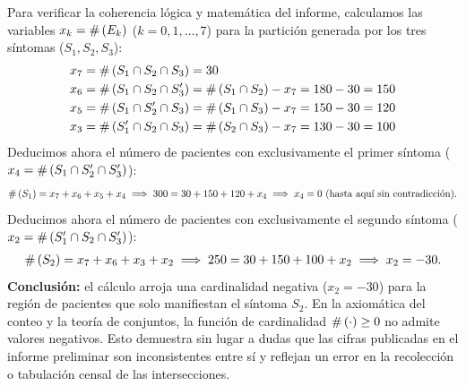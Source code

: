 \begin{solproblema}
	Para verificar la coherencia lógica y matemática del informe, calculamos las variables $x_k = \#\left( E_k \right)$ ($k=0,1,\dots,7$) para la partición generada por los tres síntomas ($S_1, S_2, S_3$):
	\begin{align}
		x_7 &= \#\left( S_1 \cap S_2 \cap S_3 \right) = 30 \\
		x_6 &= \#\left( S_1 \cap S_2 \cap S_3' \right) = \#\left( S_1 \cap S_2 \right) - x_7 = 180 - 30 = 150 \\
		x_5 &= \#\left( S_1 \cap S_2' \cap S_3 \right) = \#\left( S_1 \cap S_3 \right) - x_7 = 150 - 30 = 120 \\
		x_3 &= \#\left( S_1' \cap S_2 \cap S_3 \right) = \#\left( S_2 \cap S_3 \right) - x_7 = 130 - 30 = 100
	\end{align}
	Deducimos ahora el número de pacientes con exclusivamente el primer síntoma ($x_4 = \#\left( S_1 \cap S_2' \cap S_3' \right)$):
	\begin{align}
		\#\left( S_1 \right) = x_7 + x_6 + x_5 + x_4 \implies 300 = 30 + 150 + 120 + x_4 \implies x_4 = 0 \text{ (hasta aquí sin contradicción).}
	\end{align}
	Deducimos ahora el número de pacientes con exclusivamente el segundo síntoma ($x_2 = \#\left( S_1' \cap S_2 \cap S_3' \right)$):
	\begin{align}
		\#\left( S_2 \right) = x_7 + x_6 + x_3 + x_2 \implies 250 = 30 + 150 + 100 + x_2 \implies x_2 = -30.
	\end{align}
	\textbf{Conclusión:} el cálculo arroja una cardinalidad negativa ($x_2 = -30$) para la región de pacientes que solo manifiestan el síntoma $S_2$. En la axiomática del conteo y la teoría de conjuntos, la función de cardinalidad $\#\left( \cdot \right) \ge 0$ no admite valores negativos. Esto demuestra sin lugar a dudas que las cifras publicadas en el informe preliminar son inconsistentes entre sí y reflejan un error en la recolección o tabulación censal de las intersecciones.
\end{solproblema}

